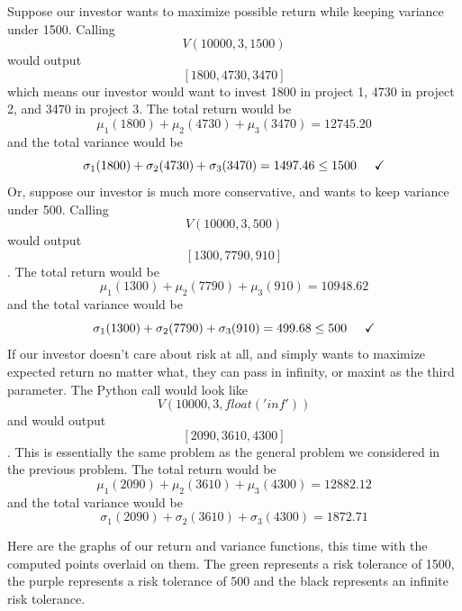 \documentclass{article}
\begin{document}
Suppose our investor wants to maximize possible return while keeping variance under 1500.
Calling $$V(10000, 3, 1500)$$ would output $$[1800, 4730, 3470]$$ which means our investor would want to invest 1800 in project 1, 4730 in project 2, and 3470 in project 3. 
\newline The total return would be $$\mu_{1}(1800) + \mu_{2}(4730) + \mu_{3}(3470) = 12745.20 $$ and the total variance would be $$\sigma_{1}(1800) + \sigma_{2}(4730) + \sigma_{3}(3470) = 1497.46 \leq 1500 \hspace{.5cm} \checkmark$$
\newline
Or, suppose our investor is much more conservative, and wants to keep variance under 500.  Calling $$V(10000, 3, 500)$$ would output $$[1300, 7790, 910]$$. 
\newline The total return would be $$\mu_{1}(1300) + \mu_{2}(7790) + \mu_{3}(910) = 10948.62 $$ and the total variance would be $$\sigma_{1}(1300) + \sigma_{2}(7790) + \sigma_{3}(910) = 499.68 \leq 500 \hspace{.5cm} \checkmark$$
\newline
If our investor doesn't care about risk at all, and simply wants to maximize expected return no matter what, they can pass in infinity, or maxint as the third parameter.  The Python call would look like $$V(10000, 3, float('inf'))$$ and would output $$[2090, 3610, 4300]$$. This is essentially the same problem as the general problem we considered in the previous problem.  
The total return would be $$\mu_{1}(2090) + \mu_{2}(3610) + \mu_{3}(4300) = 12882.12 $$ and the total variance would be $$\sigma_{1}(2090) + \sigma_{2}(3610) + \sigma_{3}(4300) = 1872.71 $$
\par Here are the graphs of our return and variance functions, this time with the computed points overlaid on them.  The green represents a risk tolerance of 1500, the purple represents a risk tolerance of 500 and the black represents an infinite risk tolerance.
\newline
\end{document}
